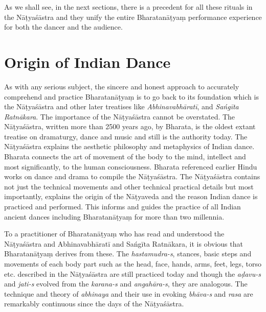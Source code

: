 As we shall see, in the next sections, there is a precedent for all these rituals in the Nāṭyaśāstra and they unify the entire Bharatanāṭyaṃ performance experience for both the dancer and the audience.


\section*{Origin of Indian Dance}

As with any serious subject, the sincere and honest approach to accurately comprehend and practice Bharatanāṭyaṃ is to go back to its foundation which is the Nāṭyaśāstra and other later treatises like \textit{Abhinavabhāratī}, and \textit{Sańgīta Ratnākara}. The importance of the Nāṭyaśāstra cannot be overstated. The Nāṭyaśāstra, written more than 2500 years ago, by Bharata, is the oldest extant treatise on dramaturgy, dance and music and still is the authority today. The Nāṭyaśāstra explains the aesthetic philosophy and metaphysics of Indian dance. Bharata connects the art of movement of the body to the mind, intellect and most significantly, to the human consciousness. Bharata referenced earlier Hindu works on dance and drama to compile the Nāṭyaśāstra. The Nāṭyaśāstra contains not just the technical movements and other technical practical details but most importantly, explains the origin of the Nāṭyaveda and the reason Indian dance is practiced and performed. This informs and guides the practice of all Indian ancient dances including Bharatanāṭyaṃ for more than two millennia. 

To a practitioner of Bharatanāṭyaṃ who has read and understood the Nāṭyaśāstra and Abhinavabhāratī and Sańgīta Ratnākara, it is obvious that Bharatanāṭyaṃ derives from these. The \textit{hastamudra-s}, stances, basic steps and movements of each body part such as the head, face, hands, arms, feet, legs, torso etc. described in the Nāṭyaśāstra are still practiced today and though the \textit{aḍavu-s }and \textit{jati-s }evolved from the \textit{karana-s} and \textit{angahāra-s}, they are analogous. The technique and theory of \textit{abhinaya} and their use in evoking \textit{bhāva-s} and \textit{rasa }are remarkably continuous since the days of the Nāṭyaśāstra.

